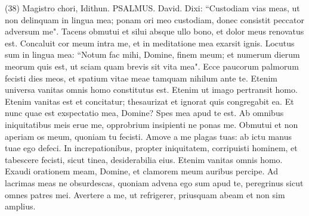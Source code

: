 \begin{biblechapter}  (38) 
\verse  Magistro chori, Idithun. PSALMUS. David. 
\verse Dixi: “Custodiam vias meas, ut non delinquam in lingua mea; ponam ori meo custodiam, donec consistit peccator adversum me". 
\verse Tacens obmutui et silui absque ullo bono, et dolor meus renovatus est. 
\verse Concaluit cor meum intra me, et in meditatione mea exarsit ignis. 
\verse Locutus sum in lingua mea: “Notum fac mihi, Domine, finem meum; et numerum dierum meorum quis est, ut sciam quam brevis sit vita mea". 
\verse Ecce paucorum palmorum fecisti dies meos, et spatium vitae meae tamquam nihilum ante te. Etenim universa vanitas omnis homo constitutus est. 
\verse Etenim ut imago pertransit homo. Etenim vanitas est et concitatur; thesaurizat et ignorat quis congregabit ea. 
\verse Et nunc quae est exspectatio mea, Domine? Spes mea apud te est. 
\verse Ab omnibus iniquitatibus meis erue me, opprobrium insipienti ne ponas me. 
\verse Obmutui et non aperiam os meum, quoniam tu fecisti. 
\verse Amove a me plagas tuas: ab ictu manus tuae ego defeci. 
\verse In increpationibus, propter iniquitatem, corripuisti hominem, et tabescere fecisti, sicut tinea, desiderabilia eius. Etenim vanitas omnis homo. 
\verse Exaudi orationem meam, Domine, et clamorem meum auribus percipe. Ad lacrimas meas ne obsurdescas, quoniam advena ego sum apud te, peregrinus sicut omnes patres mei. 
\verse Avertere a me, ut refrigerer, priusquam abeam et non sim amplius. 
\end{biblechapter}

